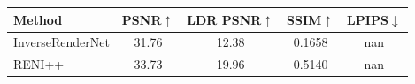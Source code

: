 \begin{tabular}{l|cccc}
\hline
Method & PSNR$\uparrow$ & LDR PSNR$\uparrow$ & SSIM$\uparrow$ & LPIPS$\downarrow$ \\
\hline
InverseRenderNet & 31.76 & 12.38 & 0.1658 & nan \\
RENI++ & 33.73 & 19.96 & 0.5140 & nan \\
\hline
\end{tabular}